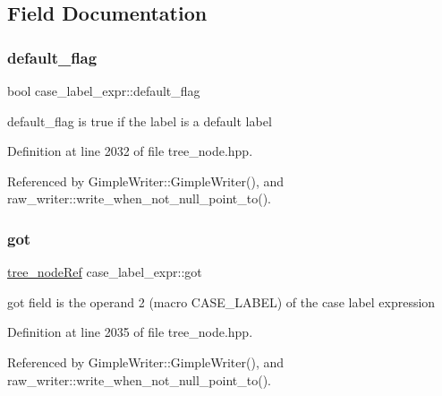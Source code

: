 \subsection{Field Documentation}
\mbox{\label{structcase__label__expr_a680465d2a1b2a47f02da705e53aa4822}} 
\subsubsection{\texorpdfstring{default\+\_\+flag}{default\_flag}}
{\footnotesize\ttfamily bool case\+\_\+label\+\_\+expr\+::default\+\_\+flag}



default\+\_\+flag is true if the label is a \textquotesingle{}default\textquotesingle{} label 



Definition at line 2032 of file tree\+\_\+node.\+hpp.



Referenced by Gimple\+Writer\+::\+Gimple\+Writer(), and raw\+\_\+writer\+::write\+\_\+when\+\_\+not\+\_\+null\+\_\+point\+\_\+to().

\mbox{\label{structcase__label__expr_acfd4cfd323c154f8aa40284a027f600e}} 
\subsubsection{\texorpdfstring{got}{got}}
{\footnotesize\ttfamily \hyperlink{tree__node_8hpp_a6ee377554d1c4871ad66a337eaa67fd5}{tree\+\_\+node\+Ref} case\+\_\+label\+\_\+expr\+::got}



got field is the operand 2 (macro C\+A\+S\+E\+\_\+\+L\+A\+B\+EL) of the case label expression 



Definition at line 2035 of file tree\+\_\+node.\+hpp.



Referenced by Gimple\+Writer\+::\+Gimple\+Writer(), and raw\+\_\+writer\+::write\+\_\+when\+\_\+not\+\_\+null\+\_\+point\+\_\+to().

